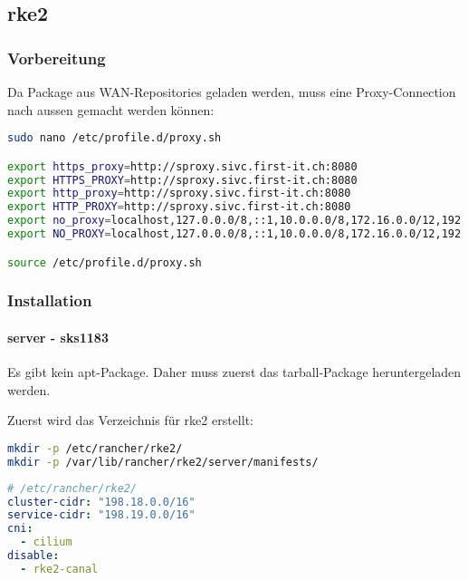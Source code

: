 
\subsection{rke2}
\subsubsection{Vorbereitung}
Da Package aus WAN-Repositories geladen werden, muss eine Proxy-Connection nach aussen gemacht werden können:
\lstset{style=gra_codestyle}
\begin{lstlisting}[language=bash, caption=Proxy Settings,captionpos=b,label={lst:proxy-settings},breaklines=true]
sudo nano /etc/profile.d/proxy.sh

export https_proxy=http://sproxy.sivc.first-it.ch:8080
export HTTPS_PROXY=http://sproxy.sivc.first-it.ch:8080
export http_proxy=http://sproxy.sivc.first-it.ch:8080
export HTTP_PROXY=http://sproxy.sivc.first-it.ch:8080
export no_proxy=localhost,127.0.0.0/8,::1,10.0.0.0/8,172.16.0.0/12,192.168.0.0/16
export NO_PROXY=localhost,127.0.0.0/8,::1,10.0.0.0/8,172.16.0.0/12,192.168.0.0/16

source /etc/profile.d/proxy.sh
\end{lstlisting}

\subsubsection{Installation}
\paragraph{server - sks1183}
Es gibt kein apt-Package.
Daher muss zuerst das tarball-Package heruntergeladen werden.

Zuerst wird das Verzeichnis für rke2 erstellt:
\lstset{style=gra_codestyle}
\begin{lstlisting}[language=bash, caption=rke2 server - Verzeichnis erstellen,captionpos=b,label={lst:rke2-server-mkdir-rke2},breaklines=true]
mkdir -p /etc/rancher/rke2/
mkdir -p /var/lib/rancher/rke2/server/manifests/
\end{lstlisting}

\lstset{style=gra_codestyle}
\begin{lstlisting}[language=yaml, caption=rke2 server - config.yaml,captionpos=b,label={lst:rke2-server-config.yaml},breaklines=true]
# /etc/rancher/rke2/
cluster-cidr: "198.18.0.0/16"
service-cidr: "198.19.0.0/16"
cni:
  - cilium
disable:
  - rke2-canal
\end{lstlisting}

